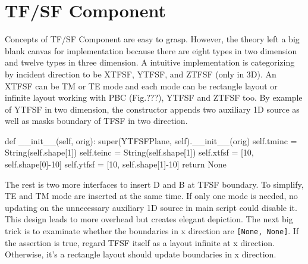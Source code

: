 \section{TF/SF Component}
Concepts of TF/SF Component are easy to grasp. However, the theory left a big blank canvas for implementation because
there are eight types in two dimension and twelve types in three dimension. A intuitive implementation is categorizing
by incident direction to be XTFSF, YTFSF, and ZTFSF (only in 3D). An XTFSF can be TM or TE mode and each mode can be
rectangle layout or infinite layout working with PBC (Fig.???), YTFSF and ZTFSF too. By example of YTFSF in two
dimension, the constructor appends two auxiliary 1D source as well as masks boundary of TFSF in two direction. 
\begin{code}
    def __init__(self, orig):
        super(YTFSFPlane, self).__init__(orig)
        self.tminc = String(self.shape[1])
        self.teinc = String(self.shape[1])
        self.xtfsf = [10, self.shape[0]-10]
        self.ytfsf = [10, self.shape[1]-10]
        return None
\end{code}
The rest is two more interfaces to insert D and B at TFSF boundary. To simplify, TE and TM mode are inserted at the same
time. If only one mode is needed, no updating on the unnecessary auxiliary 1D source in main script could disable
it. This design leads to more overhead but creates elegant depiction. The next big trick is to examinate whether the
boundaries in x direction are \texttt{[None, None]}. If the assertion is true, regard TFSF itself as a layout infinite
at x direction. Otherwise, it's a rectangle layout should update boundaries in x direction.
